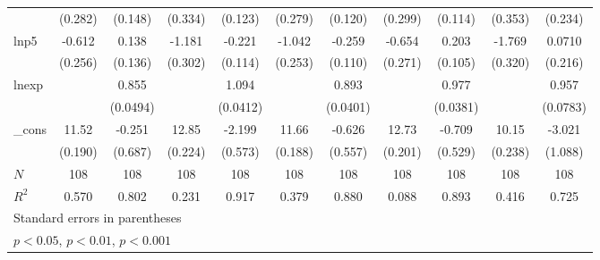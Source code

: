 {\begin{tabular}{l*{10}{c}}
            &     (0.282)         &     (0.148)         &     (0.334)         &     (0.123)         &     (0.279)         &     (0.120)         &     (0.299)         &     (0.114)         &     (0.353)         &     (0.234)         \\
[1em]
lnp5        &      -0.612\sym{*}  &       0.138         &      -1.181\sym{***}&      -0.221         &      -1.042\sym{***}&      -0.259\sym{*}  &      -0.654\sym{*}  &       0.203         &      -1.769\sym{***}&      0.0710         \\
            &     (0.256)         &     (0.136)         &     (0.302)         &     (0.114)         &     (0.253)         &     (0.110)         &     (0.271)         &     (0.105)         &     (0.320)         &     (0.216)         \\
[1em]
lnexp       &                     &       0.855\sym{***}&                     &       1.094\sym{***}&                     &       0.893\sym{***}&                     &       0.977\sym{***}&                     &       0.957\sym{***}\\
            &                     &    (0.0494)         &                     &    (0.0412)         &                     &    (0.0401)         &                     &    (0.0381)         &                     &    (0.0783)         \\
[1em]
\_cons      &       11.52\sym{***}&      -0.251         &       12.85\sym{***}&      -2.199\sym{***}&       11.66\sym{***}&      -0.626         &       12.73\sym{***}&      -0.709         &       10.15\sym{***}&      -3.021\sym{**} \\
            &     (0.190)         &     (0.687)         &     (0.224)         &     (0.573)         &     (0.188)         &     (0.557)         &     (0.201)         &     (0.529)         &     (0.238)         &     (1.088)         \\
\hline
\(N\)       &         108         &         108         &         108         &         108         &         108         &         108         &         108         &         108         &         108         &         108         \\
\(R^{2}\)   &       0.570         &       0.802         &       0.231         &       0.917         &       0.379         &       0.880         &       0.088         &       0.893         &       0.416         &       0.725         \\
\hline\hline
\multicolumn{11}{l}{\footnotesize Standard errors in parentheses}\\
\multicolumn{11}{l}{\footnotesize \sym{*} \(p<0.05\), \sym{**} \(p<0.01\), \sym{***} \(p<0.001\)}\\
\end{tabular}
}
